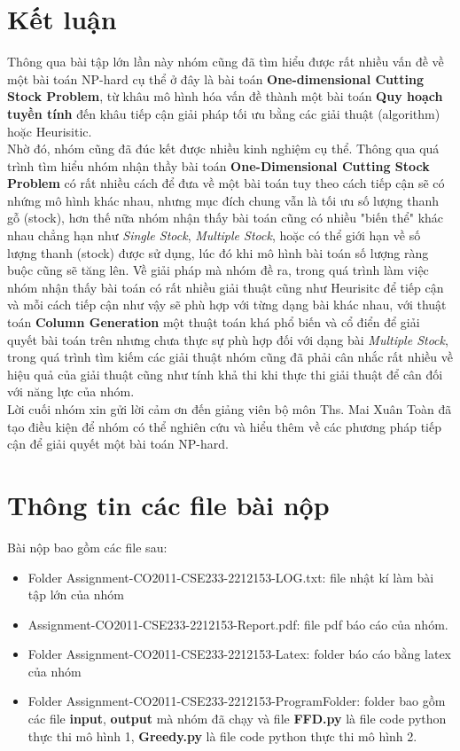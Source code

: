 \documentclass[a4paper]{article}
\begin{document}
\section{Kết luận}
\indent\indent Thông qua bài tập lớn lần này nhóm cũng đã tìm hiểu được rất nhiều vấn đề về một bài toán NP-hard cụ thể ở đây là bài toán \textbf{One-dimensional Cutting Stock Problem}, từ khâu mô hình hóa vấn đề thành một bài toán \textbf{Quy hoạch tuyền tính} đến khâu tiếp cận giải pháp tối ưu bằng các giải thuật (algorithm) hoặc Heurisitic.\\
\indent Nhờ đó, nhóm cũng đã đúc kết được nhiều kinh nghiệm cụ thể. Thông qua quá trình tìm hiểu nhóm nhận thầy bài toán \textbf{One-Dimensional Cutting Stock Problem} có rất nhiều cách để đưa về một bài toán tuy theo cách tiếp cận sẽ có nhứng mô hình khác nhau, nhưng mục đích chung vẫn là tối ưu số lượng thanh gỗ (stock), hơn thế nữa nhóm nhận thấy bài toán cũng có nhiều "biến thể" khác nhau chẳng hạn như \textit{Single Stock}, \textit{Multiple Stock}, hoặc có thể giới hạn về số lượng thanh (stock) được sử dụng, lúc đó khi mô hình bài toán số lượng ràng buộc cũng sẽ tăng lên. Về giải pháp mà nhóm đề ra, trong quá trình làm việc nhóm nhận thấy bài toán có rất nhiều giải thuật cũng như Heurisitc để tiếp cận và mỗi cách tiếp cận như vậy sẽ phù hợp với từng dạng bài khác nhau, với thuật toán \textbf{Column Generation} một thuật toán khá phổ biến và cổ điển để giải quyết bài toán trên nhưng chưa thực sự phù hợp đối với dạng bài \textit{Multiple Stock}, trong quá trình tìm kiếm các giải thuật nhóm cũng đã phải cân nhắc rất nhiều về hiệu quả của giải thuật cũng như tính khả thi khi thực thi giải thuật để cân đối với năng lực của nhóm.\\
\indent Lời cuối nhóm xin gửi lời cảm ơn đến giảng viên bộ môn Ths. Mai Xuân Toàn đã tạo điều kiện để nhóm có thể nghiên cứu và hiểu thêm về các phương pháp tiếp cận để giải quyết một bài toán NP-hard.
\section{Thông tin các file bài nộp}
\indent\indent Bài nộp bao gồm các file sau:
\begin{itemize}
    \item Folder Assignment-CO2011-CSE233-2212153-LOG.txt: file nhật kí làm bài tập lớn của nhóm
    \item Assignment-CO2011-CSE233-2212153-Report.pdf: file pdf báo cáo của nhóm.
    \item Folder Assignment-CO2011-CSE233-2212153-Latex: folder báo cáo bằng latex của nhóm
    \item Folder Assignment-CO2011-CSE233-2212153-ProgramFolder: folder bao gồm các file \textbf{input}, \textbf{output} mà nhóm đã chạy và file \textbf{FFD.py} là file code python thực  thi mô hình 1, \textbf{Greedy.py} là file code python thực thi mô hình 2.
\end{itemize}
\newpage
\end{document}
